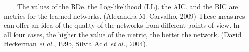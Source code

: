 ~~~~The values of the BDe, the Log-likelihood (LL), the AIC, and the BIC are metrics for the learned networks. (Alexandra M. Carvalho, 2009) These measures can offer an idea of the quality of the networks from different points of view. In all four cases, the higher the value of the metric, the better the network. (David Heckerman \emph{et al.}, 1995, Silvia Acid \emph{et al.}, 2004).